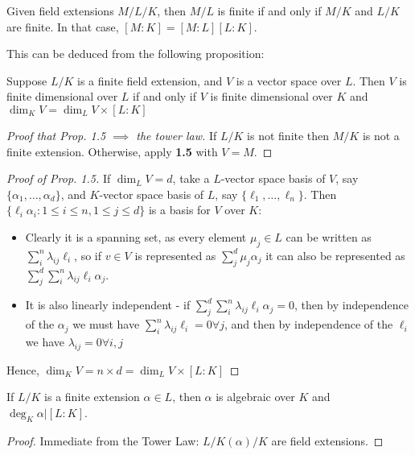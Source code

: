 \documentclass[a4paper, 10pt, twocolumn]{amsart}
\begin{document}
\begin{theorem}
Given field extensions $M/L/K$, then $M/L$ is finite if and only if $M/K$ and $L/K$ are finite. In that case, $[M:K]=[M:L][L:K]$.
\end{theorem}
This can be deduced from the following proposition:
\begin{proposition}
Suppose $L/K$ is a finite field extension, and $V$ is a vector space over $L$. Then $V$ is finite dimensional over $L$ if and only if $V$ is finite dimensional over $K$ and $\dim_K V = \dim_L V\times[L:K]$
\end{proposition}
\begin{proof}[Proof that Prop. 1.5 $\implies$ the tower law]
If $L/K$ is not finite then $M/K$ is not a finite extension. Otherwise, apply \textbf{1.5} with $V=M$.
\end{proof}
\begin{proof}[Proof of Prop. 1.5]
If $\dim_L V = d$, take a $L$-vector space basis of $V$, say $\{\alpha_1, \ldots, \alpha_d\}$, and $K$-vector space basis of $L$, say $\{\ell_1, \ldots, \ell_n\}$. Then $\{\ell_i\alpha_i : 1\leq i \leq n, 1 \leq j \leq d\}$ is a basis for $V$ over $K$: 
\begin{itemize}
\item Clearly it is a spanning set, as every element $\mu_j \in L$ can be written as $\sum_i^n \lambda_{ij}\ell_i$, so if $v\in V$ is represented as $\sum_j^d \mu_j \alpha_j$ it can also be represented as $\sum_j^d\sum_i^n \lambda_{ij}\ell_i \alpha_j$.
\item It is also linearly independent - if $\sum_j^d \sum_i^n \lambda_{ij}\ell_i \alpha_j = 0$, then by independence of the $\alpha_j$ we must have $\sum_i^n \lambda_{ij}\ell_i = 0\forall j$, and then by independence of the $\ell_i$ we have $\lambda_{ij} = 0 \forall i,j$
\end{itemize}
Hence, $\dim_K V = n\times d = \dim_L V\times[L:K]$
\end{proof}

\begin{corollary}
If $L/K$ is a finite extension $\alpha \in L$, then $\alpha$ is algebraic over $K$ and $\deg_K \alpha | [L:K]$.
\end{corollary}
\begin{proof}
Immediate from the Tower Law: $L/K(\alpha)/K$ are field extensions.
\end{proof}
\end{document}
